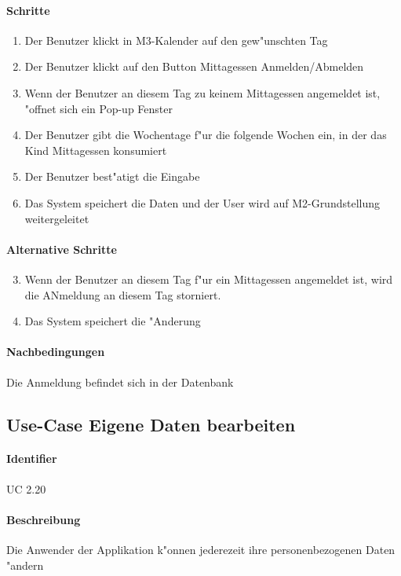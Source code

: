   \paragraph{Schritte}
  \begin{enumerate}
   \item Der Benutzer klickt in M3-Kalender auf den gew"unschten Tag
   \item Der Benutzer klickt auf den Button \dq Mittagessen Anmelden/Abmelden\dq
   \item Wenn der Benutzer an diesem Tag zu keinem Mittagessen angemeldet ist, "offnet sich ein Pop-up Fenster
   \item Der Benutzer gibt die Wochentage f"ur die folgende Wochen ein, in der das Kind Mittagessen konsumiert
   \item Der Benutzer best"atigt die Eingabe
   \item Das System speichert die Daten und der User wird auf M2-Grundstellung weitergeleitet
  \end{enumerate}

  \paragraph{Alternative Schritte}
  \begin{enumerate}
  \setcounter{enumi}{2}
   \item  Wenn der Benutzer an diesem Tag f"ur ein Mittagessen angemeldet ist, wird die ANmeldung an diesem Tag storniert.
   \item Das System speichert die "Anderung
  \end{enumerate}

  \paragraph{Nachbedingungen}
  Die Anmeldung befindet sich in der Datenbank

  
    \newpage
 \subsection{Use-Case Eigene Daten bearbeiten}
  \paragraph{Identifier}
  UC 2.20
  \paragraph{Beschreibung}
  Die Anwender der Applikation k"onnen jederezeit ihre personenbezogenen Daten "andern
